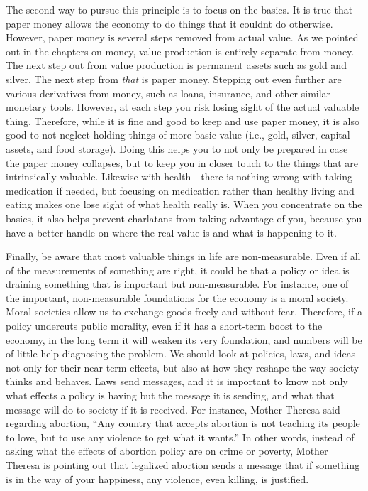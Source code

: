 The second way to pursue this principle is to focus on the basics. It is
true that paper money allows the economy to do things that it
couldn{\textquotesingle}t do otherwise. However, paper money is several
steps removed from actual value. As we pointed out in the chapters on
money, value production is entirely separate from money. The next step
out from value production is permanent assets such as gold and silver.
The next step from \textit{that} is paper money. Stepping out even
further are various derivatives from money, such as loans, insurance,
and other similar monetary tools. However, at each step you risk losing
sight of the actual valuable thing. Therefore, while it is fine and
good to keep and use paper money, it is also good to not neglect
holding things of more basic value
(i.e., gold, silver,
capital assets, and food
storage). Doing this
helps you to not only be prepared in case the paper money collapses,
but to keep
you in closer touch
to the things that are intrinsically valuable. Likewise with
health—there is nothing wrong with taking medication if needed, but
focusing on medication rather than healthy living and eating makes
one lose sight of
what health really
is. When you concentrate on the basics, it also helps prevent
charlatans from taking advantage of you, because you have a better
handle on where the real value is and what is happening to it.

Finally, be aware that most valuable things in life are non-measurable.
Even if all of the measurements of something are right, it could be
that a policy or idea is draining something that is important but
non-measurable.  For
instance, one of the important, non-measurable foundations for the
economy is a moral society.  Moral societies allow us to exchange goods
freely and without fear.  Therefore, if a policy undercuts public
morality, even if it has a short-term boost to the economy, in the long
term it will weaken its very foundation, and numbers will be of little
help diagnosing the problem.  We should look at policies, laws, and
ideas not only for their near-term effects, but also at how they
reshape the way society thinks and behaves. Laws send messages, and it
is important to know not only what effects a policy is having but the
message it is sending, and what that message will do to society if it
is received. For instance, Mother Theresa said
regarding abortion,
“Any country that accepts abortion is not teaching its people to love,
but to use any violence to get what it wants.”  In other words, instead
of asking what the effects of abortion policy are on crime or poverty,
Mother Theresa is pointing out that legalized abortion sends a message
that if something is in the way of your happiness, any violence, even
killing, is justified.  

